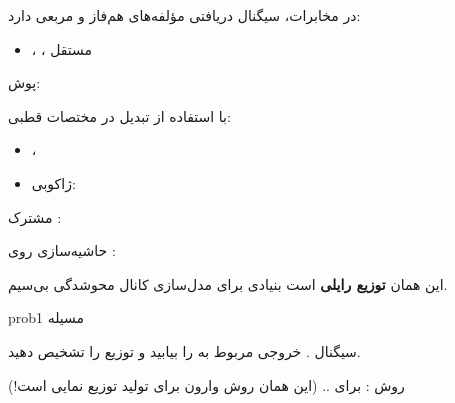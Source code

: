 

در مخابرات، سیگنال دریافتی مؤلفه‌های هم‌فاز  و مربعی  دارد:

\begin{itemize}
\tightlist
\item
  ، ، مستقل
\end{itemize}

پوش: 

با استفاده از تبدیل  در مختصات قطبی:

\begin{itemize}
\tightlist
\item
  ، 
\item
  ژاکوبی: 
\end{itemize}

 مشترک :\PSbr{}

حاشیه‌سازی روی \lr{$\theta \in [0,\, 2\pi)$}:


این همان \textbf{توزیع رایلی} است  بنیادی برای مدل‌سازی کانال محوشدگی بی‌سیم.


\begin{PSbox}[unbreakable]{prob}{مسیله 1}

سیگنال . خروجی  مربوط به  را بیابید و توزیع را تشخیص دهید.

\PSsolution{} روش :  برای .\PSbr{}. (این همان روش  وارون برای تولید توزیع نمایی است!)

\end{PSbox}

